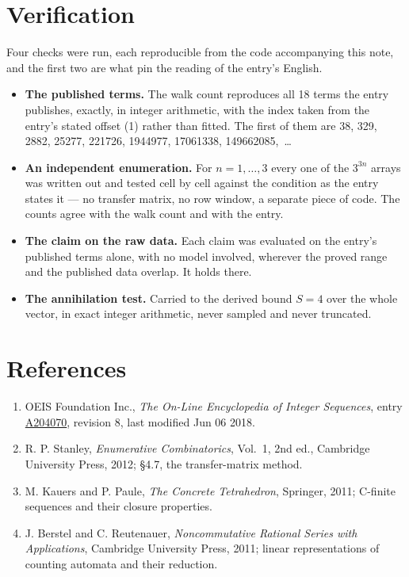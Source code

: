 \documentclass[11pt]{article}
\theoremstyle{definition}
\begin{document}
\section{Verification}

Four checks were run, each reproducible from the code accompanying this note, and the first two are what pin the reading of the entry's English.

\begin{itemize}

\item {\bfseries The published terms.} The walk count reproduces all 18 terms the entry publishes, exactly, in integer arithmetic, with the index taken from the entry's stated offset (1) rather than fitted. The first of them are 38, 329, 2882, 25277, 221726, 1944977, 17061338, 149662085,~\dots

\item {\bfseries An independent enumeration.} For $n = 1,\dots,3$ every one of the $3^{3n}$ arrays was written out and tested cell by cell against the condition as the entry states it --- no transfer matrix, no row window, a separate piece of code. The counts agree with the walk count and with the entry.

\item {\bfseries The claim on the raw data.} Each claim was evaluated on the entry's published terms alone, with no model involved, wherever the proved range and the published data overlap. It holds there.

\item {\bfseries The annihilation test.} Carried to the derived bound $S = 4$ over the whole vector, in exact integer arithmetic, never sampled and never truncated.

\end{itemize}

\section{References}

\begin{enumerate}

\item OEIS Foundation Inc., \emph{The On-Line Encyclopedia of Integer Sequences}, entry \href{https://oeis.org/A204070}{A204070}, revision 8, last modified Jun 06 2018.

\item R. P. Stanley, \emph{Enumerative Combinatorics}, Vol.~1, 2nd ed., Cambridge University Press, 2012; \S4.7, the transfer-matrix method.

\item M. Kauers and P. Paule, \emph{The Concrete Tetrahedron}, Springer, 2011; C-finite sequences and their closure properties.

\item J. Berstel and C. Reutenauer, \emph{Noncommutative Rational Series with Applications}, Cambridge University Press, 2011; linear representations of counting automata and their reduction.

\end{enumerate}
\end{document}
